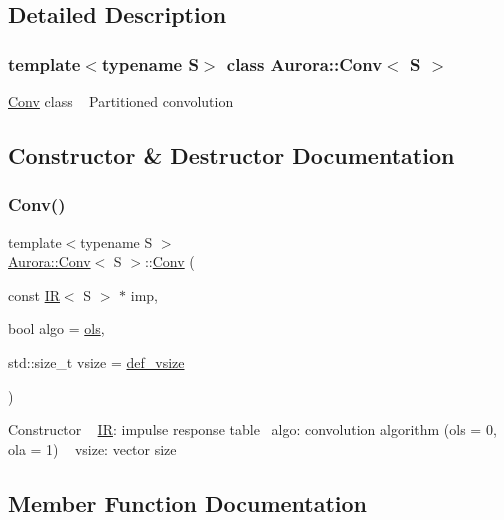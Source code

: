 \subsection{Detailed Description}
\subsubsection*{template$<$typename S$>$\newline
class Aurora\+::\+Conv$<$ S $>$}

\hyperlink{class_aurora_1_1_conv}{Conv} class ~\newline
Partitioned convolution 

\subsection{Constructor \& Destructor Documentation}
\mbox{\label{class_aurora_1_1_conv_a55fda098ad783bd6283fed023d3129b1}} 
\subsubsection{\texorpdfstring{Conv()}{Conv()}}
{\footnotesize\ttfamily template$<$typename S $>$ \\
\hyperlink{class_aurora_1_1_conv}{Aurora\+::\+Conv}$<$ S $>$\+::\hyperlink{class_aurora_1_1_conv}{Conv} (\begin{DoxyParamCaption}\item[{const \hyperlink{class_aurora_1_1_i_r}{IR}$<$ S $>$ $\ast$}]{imp,  }\item[{bool}]{algo = {\ttfamily \hyperlink{namespace_aurora_a4e816792565225ccd6ba67110f75fb8b}{ols}},  }\item[{std\+::size\+\_\+t}]{vsize = {\ttfamily \hyperlink{namespace_aurora_afaaddf667a06e7ce23c667a8b7295263}{def\+\_\+vsize}} }\end{DoxyParamCaption})\hspace{0.3cm}{\ttfamily [inline]}}

Constructor ~\newline
\hyperlink{class_aurora_1_1_i_r}{IR}\+: impulse response table~\newline
algo\+: convolution algorithm (ols = 0, ola = 1) ~\newline
vsize\+: vector size 

\subsection{Member Function Documentation}
\mbox{\label{class_aurora_1_1_conv_aeefccb7a11338388723bb78e025ad030}} 
